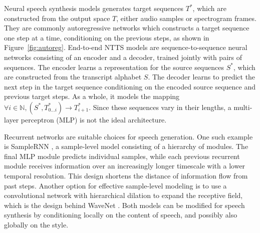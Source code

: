 \documentclass[11pt]{article}
\begin{document}
Neural speech synthesis models generates target sequences \(T^{\ast}\),
which are constructed from the output space \(T\),
either audio samples or spectrogram frames.
They are commonly autoregressive networks
which constructs a target sequence one step at a time,
conditioning on the previous steps,
as shown in Figure~\ref{fig:autoreg}.
End-to-end NTTS models are sequence-to-sequence neural networks
consisting of an encoder and a decoder,
trained jointly with pairs of sequences.
The encoder learns a representation for the source sequences \(S^{\ast}\),
which are constructed from the transcript alphabet \(S\).
The decoder learns to predict the next step in the target sequence
conditioning on the encoded source sequence and previous target steps.
As a whole, it models the mapping
\(\forall i \in \mathbb{N}, \left(S^{\ast}, T^{\ast}_{0 \ldots i}\right) \to T^{\ast}_{i+1}\).
Since these sequences vary in their lengths,
a multi-layer perceptron (MLP) is not the ideal architecture.

Recurrent networks are suitable choices for speech generation.
One such example is SampleRNN \parencite{mehri2016samplernn},
a sample-level model consisting of a hierarchy of modules.
The final MLP module predicts individual samples,
while each previous recurrent module receives information over
an increasingly longer timescale with a lower temporal resolution.
This design shortens the distance of information flow from past steps.
Another option for effective sample-level modeling is to use
a convolutional network with hierarchical dilation to expand the receptive field,
which is the design behind WaveNet \parencite{van2016wavenet}.
Both models can be modified for speech synthesis by conditioning locally
on the content of speech, and possibly also globally on the style.
\end{document}

